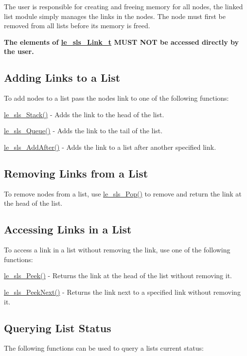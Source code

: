The user is responsible for creating and freeing memory for all nodes, the linked list module simply manages the links in the nodes. The node must first be removed from all lists before its memory is freed.

{\bfseries The elements of \hyperlink{structle__sls___link__t}{le\+\_\+sls\+\_\+\+Link\+\_\+t} M\+U\+S\+T N\+O\+T be accessed directly by the user.}\hypertarget{c_singly_linked_list_sls_add}{}\subsection{Adding Links to a List}\label{c_singly_linked_list_sls_add}
To add nodes to a list pass the node\textquotesingle{}s link to one of the following functions\+:


\begin{DoxyItemize}
\item \hyperlink{le__singly_linked_list_8h_aca4266a87d4c5e3dca130cd5d48b99af}{le\+\_\+sls\+\_\+\+Stack()} -\/ Adds the link to the head of the list.
\item \hyperlink{le__singly_linked_list_8h_afb5e8ffc3fb5c0d86eb47d0885a6f546}{le\+\_\+sls\+\_\+\+Queue()} -\/ Adds the link to the tail of the list.
\item \hyperlink{le__singly_linked_list_8h_a69f5c789a64d372bb61b173c4418b14b}{le\+\_\+sls\+\_\+\+Add\+After()} -\/ Adds the link to a list after another specified link.
\end{DoxyItemize}\hypertarget{c_singly_linked_list_sls_remove}{}\subsection{Removing Links from a List}\label{c_singly_linked_list_sls_remove}
To remove nodes from a list, use {\ttfamily \hyperlink{le__singly_linked_list_8h_a85f5132147870e260b3b142665ec587e}{le\+\_\+sls\+\_\+\+Pop()}} to remove and return the link at the head of the list.\hypertarget{c_singly_linked_list_sls_peek}{}\subsection{Accessing Links in a List}\label{c_singly_linked_list_sls_peek}
To access a link in a list without removing the link, use one of the following functions\+:


\begin{DoxyItemize}
\item {\ttfamily \hyperlink{le__singly_linked_list_8h_a63e301829d4a513c97dbda3943efa791}{le\+\_\+sls\+\_\+\+Peek()}} -\/ Returns the link at the head of the list without removing it.
\item {\ttfamily \hyperlink{le__singly_linked_list_8h_aed118352d62f4df6301040bc1cd26431}{le\+\_\+sls\+\_\+\+Peek\+Next()}} -\/ Returns the link next to a specified link without removing it.
\end{DoxyItemize}\hypertarget{c_singly_linked_list_sls_query}{}\subsection{Querying List Status}\label{c_singly_linked_list_sls_query}
The following functions can be used to query a list\textquotesingle{}s current status\+:


